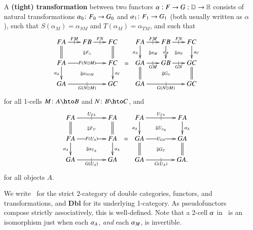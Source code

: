 \begin{defn}\label{thm:dbl-transf}
  A \textbf{(tight) transformation} between two functors $\alpha:
  F\to G:\mathbb{D}\to\mathbb{E}$ consists of natural transformations $\alpha_0\colon
  F_0\to G_0$ and $\alpha_1\colon F_1\to G_1$ (both usually written as
  $\alpha$), such that $S(\alpha_{M}) = \alpha_{SM}$ and
  $T(\alpha_{M}) = \alpha_{TM}$, and such that
  \[\vcenter{\xymatrix@-.5pc{
      FA \ar@{=}[d] \ar[r]|{|}^{FM}
      \ar@{}[drr]|{\Downarrow F_\odot} &
      FB \ar[r]|{|}^{FN} &
      FC \ar@{=}[d]\\
      FA \ar[rr]|{F(N\odot M)} \ar[d]_{\alpha_A}
      \ar@{}[drr]|{\Downarrow \alpha_{N\odot M}} &&
      FC \ar[d]^{\alpha_C}\\
      GA \ar[rr]|{|}_{G(N\odot M)} && GC
    }} =
  \vcenter{\xymatrix@-.5pc{
      FA \ar[d]_{\alpha_A} \ar@{}[dr]|{\Downarrow \alpha_M} \ar[r]|{|}^{FM} &
      FB \ar[d]|{\alpha_B} \ar@{}[dr]|{\Downarrow \alpha_N} \ar[r]|{|}^{FN} &
      FC \ar[d]^{\alpha_C}\\
      GA \ar@{=}[d] \ar[r]|{|}_{GM} \ar@{}[drr]|{\Downarrow G_\odot} &
      GB \ar[r]|{|}_{GN} &
      GC \ar@{=}[d]\\
      GA \ar[rr]|{|}_{G(N\odot M)} && GC
    }}\]
  for all 1-cells $M\colon A\hto B$ and $N\colon B\hto C$, and
  \[\vcenter{\xymatrix@-.5pc{
      FA \ar[rr]|{|}^{U_{FA}} \ar@{=}[d]
      \ar@{}[drr]|{\Downarrow F_U} &&
      FA \ar@{=}[d]\\
      FA \ar[rr]|{F(U_A)} \ar[d]_{\alpha_A}
      \ar@{}[drr]|{\Downarrow \alpha_{U_A}} &&
      FA \ar[d]^{\alpha_A}\\
      GA \ar[rr]|{|}_{G(U_A)} && GA
    }} =
  \vcenter{\xymatrix@-.5pc{
      FA \ar[rr]|{|}^{U_{FA}} \ar[d]_{\alpha_A}
      \ar@{}[drr]|{\Downarrow U_{\alpha_A}} &&
      FA \ar[d]^{\alpha_A}\\
      GA \ar[rr]|{U_{GA}} \ar@{=}[d]
      \ar@{}[drr]|{\Downarrow G_U} &&
      GA \ar@{=}[d]\\
      GA \ar[rr]|{|}_{G(U_A)} && GA.
    }}\]
  for all objects $A$.
\end{defn}

We write \cDbl\ for the strict 2-category of double categories, functors, and transformations, and $\mathbf{Dbl}$ for its underlying 1-category. As pseudofunctors compose strictly associatively, this is well-defined. Note that a 2-cell $\alpha$ in \cDbl\ is an isomorphism just when each
$\alpha_A$, \emph{and} each $\alpha_M$, is invertible.

